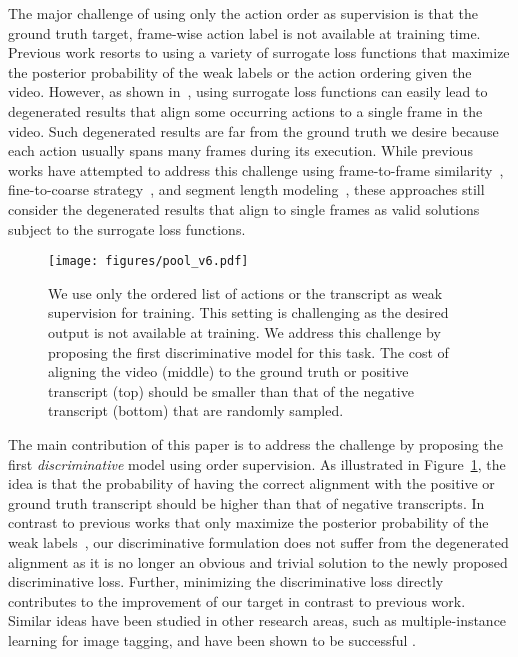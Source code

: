 \documentclass[10pt,twocolumn,letterpaper]{article}
\begin{document}
The major challenge of using only the action order as supervision is that the ground truth target, frame-wise action label is not available at training time.  Previous work resorts to using a variety of surrogate loss functions that maximize the posterior probability of the weak labels or the action ordering given the video. However, as shown in~\cite{huang2016connectionist}, using surrogate loss functions can easily lead to degenerated results that align some occurring actions to a single frame in the video. Such degenerated results are far from the ground truth we desire because each action usually spans many frames during its execution. While previous works have attempted to address this challenge using frame-to-frame similarity~\cite{huang2016connectionist}, fine-to-coarse strategy~\cite{richard2017weakly}, and segment length modeling~\cite{richard2018neuralnetwork}, these approaches still consider the degenerated results that align to single frames as valid solutions subject to the surrogate loss functions.

\begin{figure}[tb]
\centering
\texttt{[image: figures/pool\_v6.pdf]}
\caption{
   We use only the ordered list of actions or the transcript as weak supervision for training. 
   This setting is challenging as the desired output is not available at training. We address this challenge by proposing the first discriminative model for this task. The cost  of aligning the video  (middle) to the ground truth or positive transcript  (top) should be smaller than that of the negative transcript  (bottom) that are randomly sampled.
   }
   \vspace{-1mm}
\label{fig:fig1}
\end{figure}


{The main contribution of this paper is to address the challenge by proposing the first \emph{discriminative} model using order supervision. As illustrated in Figure~\ref{fig:fig1}, the idea is that the probability of having the correct alignment with the positive or ground truth transcript should be higher than that of negative transcripts. In contrast to previous works that only maximize the posterior probability of the weak labels~\cite{huang2016connectionist,richard2017weakly,richard2018neuralnetwork}, our discriminative formulation does not suffer from the degenerated alignment as it is no longer an obvious and trivial solution to the newly proposed discriminative loss. } Further, minimizing the discriminative loss directly contributes to the improvement of our target in contrast to previous work. Similar ideas have been studied in other research areas, such as multiple-instance learning for image tagging, and have been shown to be successful \cite{wu2015deep}.
\end{document}
